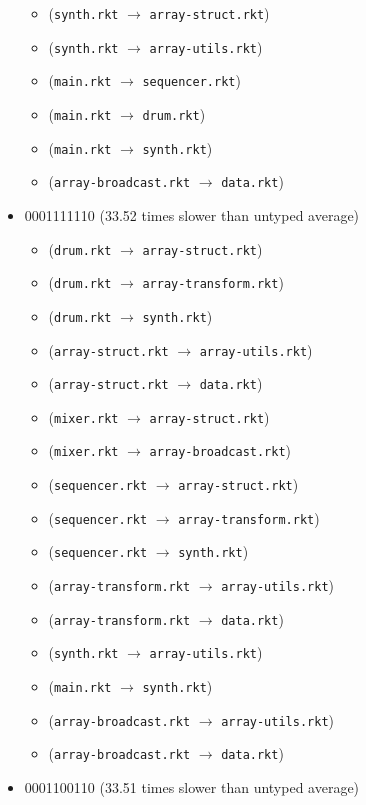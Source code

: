 \documentclass{article}
\newcommand{\mono}[1]{\texttt{#1}}
\begin{document}
\begin{itemize}
\begin{itemize}
  \item (\mono{synth.rkt} $\rightarrow$ \mono{array-struct.rkt})
  \item (\mono{synth.rkt} $\rightarrow$ \mono{array-utils.rkt})
  \item (\mono{main.rkt} $\rightarrow$ \mono{sequencer.rkt})
  \item (\mono{main.rkt} $\rightarrow$ \mono{drum.rkt})
  \item (\mono{main.rkt} $\rightarrow$ \mono{synth.rkt})
  \item (\mono{array-broadcast.rkt} $\rightarrow$ \mono{data.rkt})
  \end{itemize}
\item 0001111110 (33.52 times slower than untyped average)
  \begin{itemize}
  \item (\mono{drum.rkt} $\rightarrow$ \mono{array-struct.rkt})
  \item (\mono{drum.rkt} $\rightarrow$ \mono{array-transform.rkt})
  \item (\mono{drum.rkt} $\rightarrow$ \mono{synth.rkt})
  \item (\mono{array-struct.rkt} $\rightarrow$ \mono{array-utils.rkt})
  \item (\mono{array-struct.rkt} $\rightarrow$ \mono{data.rkt})
  \item (\mono{mixer.rkt} $\rightarrow$ \mono{array-struct.rkt})
  \item (\mono{mixer.rkt} $\rightarrow$ \mono{array-broadcast.rkt})
  \item (\mono{sequencer.rkt} $\rightarrow$ \mono{array-struct.rkt})
  \item (\mono{sequencer.rkt} $\rightarrow$ \mono{array-transform.rkt})
  \item (\mono{sequencer.rkt} $\rightarrow$ \mono{synth.rkt})
  \item (\mono{array-transform.rkt} $\rightarrow$ \mono{array-utils.rkt})
  \item (\mono{array-transform.rkt} $\rightarrow$ \mono{data.rkt})
  \item (\mono{synth.rkt} $\rightarrow$ \mono{array-utils.rkt})
  \item (\mono{main.rkt} $\rightarrow$ \mono{synth.rkt})
  \item (\mono{array-broadcast.rkt} $\rightarrow$ \mono{array-utils.rkt})
  \item (\mono{array-broadcast.rkt} $\rightarrow$ \mono{data.rkt})
  \end{itemize}
\item 0001100110 (33.51 times slower than untyped average)

\end{itemize}
\end{document}
